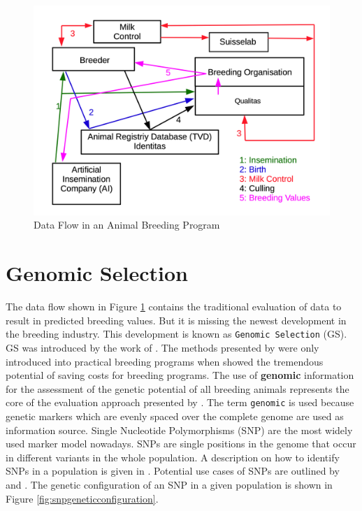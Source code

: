 \documentclass[]{book}
\theoremstyle{definition}
\theoremstyle{definition}
\theoremstyle{definition}
\theoremstyle{remark}
\begin{document}
\begin{figure}
\centering
\includegraphics{odg/datacollectionflow.png}
\caption{\label{fig:datacollectionflow}Data Flow in an Animal Breeding Program}
\end{figure}

\hypertarget{asm-genomic-selection}{%
\section{Genomic Selection}\label{asm-genomic-selection}}

The data flow shown in Figure \ref{fig:datacollectionflow} contains the traditional evaluation of data to result in predicted breeding values. But it is missing the newest development in the breeding industry. This development is known as \texttt{Genomic\ Selection} (GS). GS was introduced by the work of \citep{Meuwissen2001}. The methods presented by \citep{Meuwissen2001} were only introduced into practical breeding programs when \citep{Schaeffer2006} showed the tremendous potential of saving costs for breeding programs. The use of \textbf{genomic} information for the assessment of the genetic potential of all breeding animals represents the core of the evaluation approach presented by \citep{Meuwissen2001}. The term \texttt{genomic} is used because genetic markers which are evenly spaced over the complete genome are used as information source. Single Nucleotide Polymorphisms (SNP) are the most widely used marker model nowadays. SNPs are single positions in the genome that occur in different variants in the whole population. A description on how to identify SNPs in a population is given in \citep{Czech2018}. Potential use cases of SNPs are outlined by \citep{SeidelJr.2010} and \citep{Pant2012}. The genetic configuration of an SNP in a given population is shown in Figure \ref{fig:snpgeneticconfiguration}.
\end{document}
